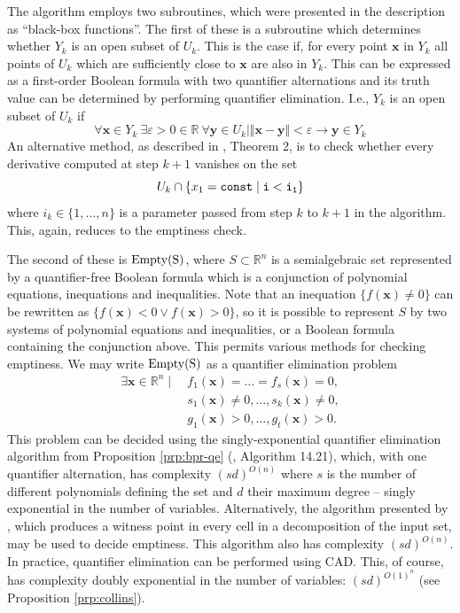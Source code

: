 \documentclass[
]{book}
\theoremstyle{definition}
\theoremstyle{definition}
\theoremstyle{definition}
\theoremstyle{definition}
\theoremstyle{remark}
\begin{document}
The algorithm employs two subroutines, which were presented in the description as ``black-box functions''.
The first of these is a subroutine which determines whether \(Y_k\) is an open subset of \(U_k\).
This is the case if, for every point \(\mathbf{x}\) in \(Y_k\) all points of \(U_k\) which are sufficiently close to \(\mathbf{x}\) are also in \(Y_k\).
This can be expressed as a first-order Boolean formula with two quantifier alternations and its truth value can be determined by performing quantifier elimination. I.e., \(Y_k\) is an open subset of \(U_k\) if
\[
\forall \mathbf{x} \in Y_k \> \exists \varepsilon > 0 \in \mathbb{R}\> \forall \mathbf{y} \in U_k \mid \Vert \mathbf{x} - \mathbf{y} \Vert < \varepsilon \rightarrow \mathbf{y} \in Y_k
\]
An alternative method, as described in \citet{gv1995}, Theorem 2, is to check whether every derivative computed at step \(k+1\) vanishes on the set
\[
U_k \cap \{ x_1 = \tt{const} \mid i < i_1 \}
\]
where \(i_k \in \{1,\ldots,n\}\) is a parameter passed from step \(k\) to \(k+1\) in the algorithm.
This, again, reduces to the emptiness check.

The second of these is \(\rm{Empty}(S)\), where \(S \subset \mathbb{R}^n\) is a semialgebraic set represented by a quantifier-free Boolean formula which is a conjunction of polynomial equations, inequations and inequalities. Note that an inequation \(\{ f(\mathbf{x}) \ne 0 \}\) can be rewritten as \(\{ f(\mathbf{x}) < 0 \lor f(\mathbf{x}) > 0 \}\), so it is possible to represent \(S\) by two systems of polynomial equations and inequalities, or a Boolean formula containing the conjunction above. This permits various methods for checking emptiness. We may write \(\rm{Empty}(S)\) as a quantifier elimination problem
\begin{align*}
\exists \mathbf{x} \in \mathbb{R}^n \mid\ & f_1(\mathbf{x}) = \ldots = f_s(\mathbf{x}) = 0,\\
& s_1(\mathbf{x}) \ne 0, \ldots, s_k(\mathbf{x}) \ne 0,\\
& g_1(\mathbf{x}) > 0, \ldots, g_t(\mathbf{x}) > 0.
\end{align*}
This problem can be decided using the singly-exponential quantifier elimination algorithm from Proposition \ref{prp:bpr-qe} (\citet{bpr2006}, Algorithm 14.21), which, with one quantifier alternation, has complexity \((sd)^{O(n)}\) where \(s\) is the number of different polynomials defining the set and \(d\) their maximum degree -- singly exponential in the number of variables. Alternatively, the algorithm presented by \citet{bpr98}, which produces a witness point in every cell in a decomposition of the input set, may be used to decide emptiness. This algorithm also has complexity \((sd)^{O(n)}\).
In practice, quantifier elimination can be performed using CAD. This, of course, has complexity doubly exponential in the number of variables: \((sd)^{O(1)^n}\) (see Proposition \ref{prp:collins}).
\end{document}
